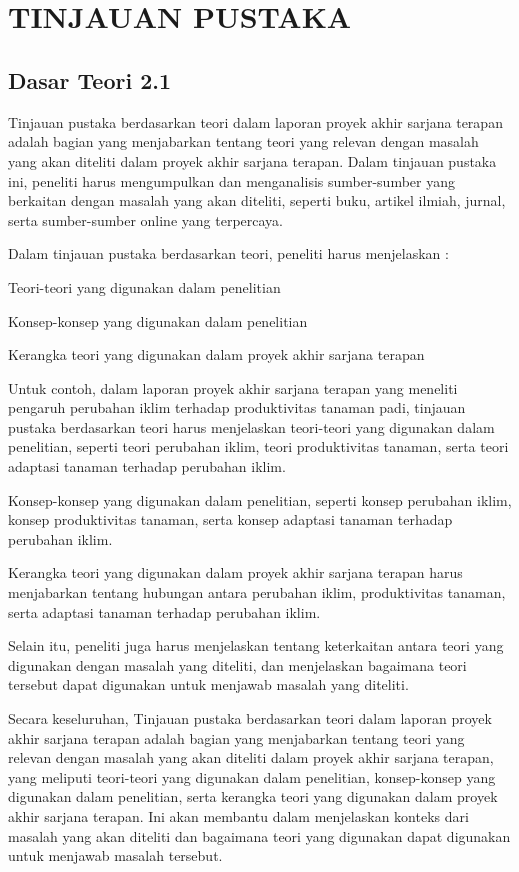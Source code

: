 \chapter[TINJAUAN PUSTAKA]{\\ TINJAUAN PUSTAKA}

\section{Dasar Teori 2.1}
Tinjauan pustaka berdasarkan teori dalam laporan proyek akhir sarjana terapan adalah bagian yang menjabarkan tentang teori yang relevan dengan masalah yang akan diteliti dalam proyek akhir sarjana terapan. Dalam tinjauan pustaka ini, peneliti harus mengumpulkan dan menganalisis sumber-sumber yang berkaitan dengan masalah yang akan diteliti, seperti buku, artikel ilmiah, jurnal, serta sumber-sumber online yang terpercaya.

Dalam tinjauan pustaka berdasarkan teori, peneliti harus menjelaskan :
\begin{packed_item}
    \item Teori-teori yang digunakan dalam penelitian
    \item Konsep-konsep yang digunakan dalam penelitian
    \item Kerangka teori yang digunakan dalam proyek akhir sarjana terapan
\end{packed_item}

Untuk contoh, dalam laporan proyek akhir sarjana terapan yang meneliti pengaruh perubahan iklim terhadap produktivitas tanaman padi, tinjauan pustaka berdasarkan teori harus menjelaskan teori-teori yang digunakan dalam penelitian, seperti teori perubahan iklim, teori produktivitas tanaman, serta teori adaptasi tanaman terhadap perubahan iklim.

Konsep-konsep yang digunakan dalam penelitian, seperti konsep perubahan iklim, konsep produktivitas tanaman, serta konsep adaptasi tanaman terhadap perubahan iklim.

Kerangka teori yang digunakan dalam proyek akhir sarjana terapan harus menjabarkan tentang hubungan antara perubahan iklim, produktivitas tanaman, serta adaptasi tanaman terhadap perubahan iklim.

Selain itu, peneliti juga harus menjelaskan tentang keterkaitan antara teori yang digunakan dengan masalah yang diteliti, dan menjelaskan bagaimana teori tersebut dapat digunakan untuk menjawab masalah yang diteliti.

Secara keseluruhan, Tinjauan pustaka berdasarkan teori dalam laporan proyek akhir sarjana terapan adalah bagian yang menjabarkan tentang teori yang relevan dengan masalah yang akan diteliti dalam proyek akhir sarjana terapan, yang meliputi teori-teori yang digunakan dalam penelitian, konsep-konsep yang digunakan dalam penelitian, serta kerangka teori yang digunakan dalam proyek akhir sarjana terapan. Ini akan membantu dalam menjelaskan konteks dari masalah yang akan diteliti dan bagaimana teori yang digunakan dapat digunakan untuk menjawab masalah tersebut.

